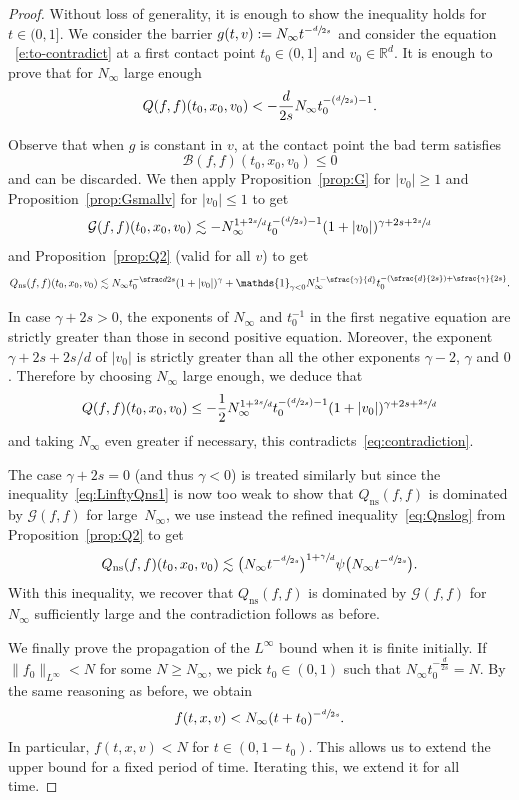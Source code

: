 \documentclass[JEP,XML,SOM,Unicode,NoFloatCountersInSection]{cedram}
\newcommand{\Psfrac}[2]{(\sfrac{#1}{#2})}
\newcommand{\ns}{\mathrm{ns}}
\theoremstyle{plain}
\theoremstyle{definition}
\numberwithin{equation}{section}
\newcommand{\R}{\mathbb R}
\newcommand{\one}{\mathds{1}}
\let\A N
\begin{document}
\begin{proof}
Without loss of generality, it is enough to show the inequality holds
for $t \in (0,1]$. We consider the barrier
$g(t,v) := \A_\infty t^{-\sfrac d {2s}}$ and consider the equation
~\eqref{e:to-contradict} at a first contact point $t_0 \in (0,1]$ and
$v_0 \in \R^d$. It is enough to prove that
for $\A_\infty$ large enough
\begin{equation}\label{eq:contradiction}
Q(f,f)(t_0,x_0,v_0) < -\frac d {2s} \A_\infty t_0^{-\Psfrac d {2s}-1}.
\end{equation}

Observe that when $g$ is constant in $v$, at the contact point the bad
term satisfies
\[
\mathcal{B}(f,f)(t_0,x_0,v_0) \le 0
\]
and can be discarded. We then apply Proposition~\ref{prop:G} for
$|v_0| \ge 1$ and Proposition~\ref{prop:Gsmallv} for $|v_0| \le 1$ to
get
\begin{equation*}
\mathcal G(f,f)(t_0,x_0,v_0) \lesssim - \A_\infty^{1+\sfrac{2s}{d}} t_0^{-\Psfrac d {2s}-1}
(1+|v_0|)^{\gamma+2s +\sfrac{2s}{d}}
\end{equation*}
and Proposition~\ref{prop:Q2} (valid for all $v$) to get
\begin{equation}\label{eq:LinftyQns1}
Q_{\ns}(f,f)(t_0,x_0,v_0) \lesssim \A_\infty t_0^{-\sfrac d {2s}}(1+|v_0|)^{\gamma} +
\one_{\gamma <0} \A_\infty^{1-\sfrac{\gamma}{d}} t_0^{-\Psfrac d {2s}+\sfrac{\gamma}{2s}}.
\end{equation}

In case $\gamma + 2s > 0$, the exponents of $\A_\infty$ and $t_0^{-1}$
in the first negative equation are strictly greater than those
in second positive equation. Moreover, the exponent
$\gamma+2s+2s/d$ of $|v_0|$ is strictly greater than all the other
exponents $\gamma-2$, $\gamma$ and $0$. Therefore by choosing
$\A_\infty$ large enough, we deduce that
\[
Q(f,f)(t_0,x_0,v_0) \le - \frac12 \A_\infty^{1+\sfrac{2s}{d}}
t_0^{-\Psfrac d {2s}-1} (1+|v_0|)^{\gamma+2s +\sfrac{2s}{d}}
\]
and taking $\A_\infty$ even greater if necessary, this
contradicts~\eqref{eq:contradiction}.

The case $\gamma+2s=0$ (and thus $\gamma <0$) is treated similarly but
since the inequality~\eqref{eq:LinftyQns1} is now too weak to show
that $Q_{\ns}(f,f)$ is dominated by $\mathcal{G}(f,f)$ for large~$\A_\infty$, we use instead the refined inequality~\eqref{eq:Qnslog}
from Proposition~\ref{prop:Q2} to get
\[
Q_{\ns}(f,f)(t_0,x_0,v_0) \lesssim \bigl( \A_\infty t^{-\sfrac d {2s}}
\bigr)^{1+\sfrac{\gamma}d} \psi \bigl( \A_\infty t^{-\sfrac d
{2s}} \bigr).
\]
With this inequality, we recover that $Q_{\ns}(f,f)$ is dominated by
$\mathcal{G}(f,f)$ for $\A_\infty$ sufficiently large and the
contradiction follows as before.

We finally prove the propagation of the $L^\infty$ bound when it is finite
initially. If $\|f_0\|_{L^\infty} < \A$ for some $\A \geq \A_\infty$,
we pick $t_0 \in (0,1)$ such that
$\A_\infty t_0^{-\frac d {2s}} = \A$. By the same reasoning as before,
we obtain
\[ f(t,x,v) < \A_\infty (t+t_0)^{-\sfrac d {2s}}.\] In particular,
$f(t,x,v) < \A$ for $t \in (0,1-t_0)$. This allows us to extend the
upper bound for a fixed period of time. Iterating this, we extend it
for all time.
\end{proof}
\end{document}

